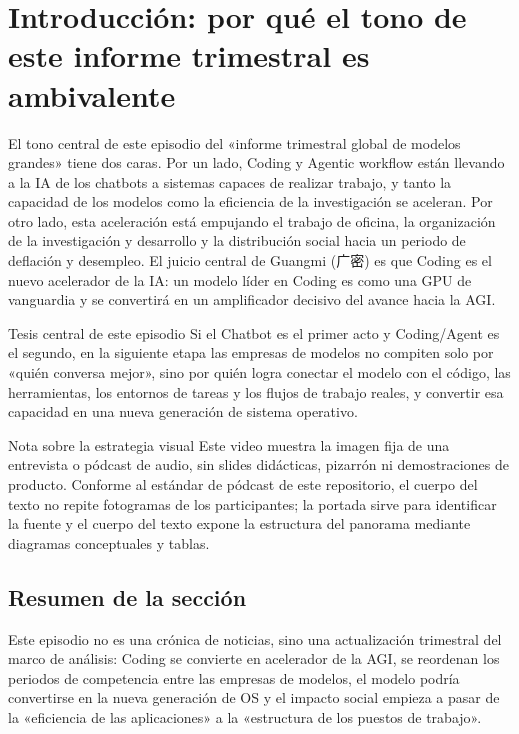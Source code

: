\section{Introducción: por qué el tono de este informe trimestral es ambivalente}

El tono central de este episodio del «informe trimestral global de modelos grandes» tiene dos caras. Por un lado, Coding y Agentic workflow están llevando a la IA de los chatbots a sistemas capaces de realizar trabajo, y tanto la capacidad de los modelos como la eficiencia de la investigación se aceleran. Por otro lado, esta aceleración está empujando el trabajo de oficina, la organización de la investigación y desarrollo y la distribución social hacia un periodo de deflación y desempleo. El juicio central de Guangmi (广密) es que Coding es el nuevo acelerador de la IA: un modelo líder en Coding es como una GPU de vanguardia y se convertirá en un amplificador decisivo del avance hacia la AGI.

\begin{importantbox}{Tesis central de este episodio}
Si el Chatbot es el primer acto y Coding/Agent es el segundo, en la siguiente etapa las empresas de modelos no compiten solo por «quién conversa mejor», sino por quién logra conectar el modelo con el código, las herramientas, los entornos de tareas y los flujos de trabajo reales, y convertir esa capacidad en una nueva generación de sistema operativo.
\end{importantbox}

\begin{knowledgebox}{Nota sobre la estrategia visual}
Este video muestra la imagen fija de una entrevista o pódcast de audio, sin slides didácticas, pizarrón ni demostraciones de producto. Conforme al estándar de pódcast de este repositorio, el cuerpo del texto no repite fotogramas de los participantes; la portada sirve para identificar la fuente y el cuerpo del texto expone la estructura del panorama mediante diagramas conceptuales y tablas.
\end{knowledgebox}

\subsection{Resumen de la sección}

Este episodio no es una crónica de noticias, sino una actualización trimestral del marco de análisis: Coding se convierte en acelerador de la AGI, se reordenan los periodos de competencia entre las empresas de modelos, el modelo podría convertirse en la nueva generación de OS y el impacto social empieza a pasar de la «eficiencia de las aplicaciones» a la «estructura de los puestos de trabajo».
